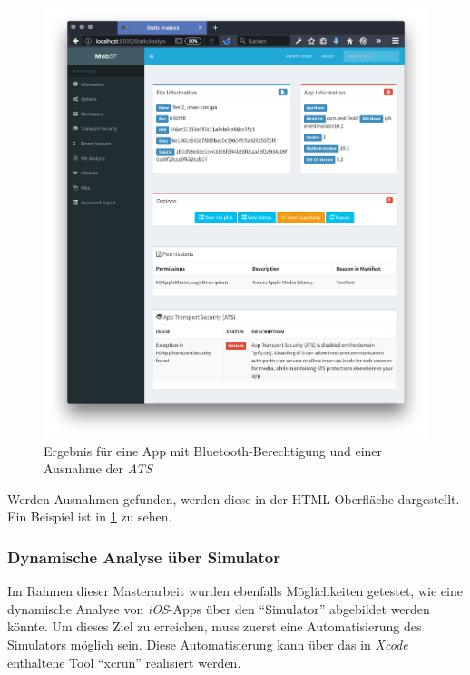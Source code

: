\begin{figure}[htbp]
	\centering
	\includegraphics[width=\textwidth]{bilder/pentest_mobile_anwendungen/weiterentw_mobsf/perm_con_check.png}
	\caption{Ergebnis für eine App mit Bluetooth-Berechtigung und einer Ausnahme der \textit{ATS}}
	\label{fig:permission_check}
\end{figure}


Werden Ausnahmen gefunden, werden diese in der HTML-Oberfläche dargestellt. Ein Beispiel ist in \ref{fig:permission_check} zu sehen.


\subsubsection{Dynamische Analyse über Simulator}
Im Rahmen dieser Masterarbeit wurden ebenfalls Möglichkeiten getestet, wie eine dynamische Analyse von \textit{iOS}-Apps über den "`Simulator"' abgebildet werden könnte. Um dieses Ziel zu erreichen, muss zuerst eine Automatisierung des Simulators möglich sein. Diese Automatisierung kann über das in \textit{Xcode} enthaltene Tool "`xcrun"' realisiert werden.\\

